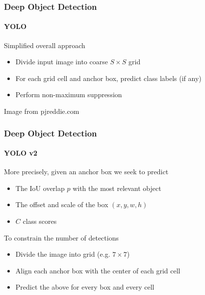 \documentclass[xetex,professionalfont]{beamer}
\begin{document}
\begin{frame}
	\frametitle{Deep Object Detection}
	\framesubtitle{YOLO}

	Simplified overall approach
	\begin{itemize}
		\item Divide input image into coarse $S\times S$ grid
		\item For each grid cell and anchor box, predict class labels (if any)
		\item Perform non-maximum suppression
	\end{itemize}

	\medskip

	\begin{center}
		{\centering Image from pjreddie.com}
	\end{center}

\end{frame}


\begin{frame}
	\frametitle{Deep Object Detection}
	\framesubtitle{YOLO v2}

	More precisely, given an anchor box we seek to predict
	\begin{itemize}
		\item The IoU overlap $p$ with the most relevant object %
		\item The offset and scale of the box $(x,y,w,h)$ %
		\item $C$ class scores %
	\end{itemize}

	\bigskip

	To constrain the number of detections %
	\begin{itemize}
		\item Divide the image into grid (e.g. $7\times7$)
		\item Align each anchor box with the center of each grid cell
		\item Predict the above for every box and every cell
	\end{itemize}

\end{frame}
\end{document}
